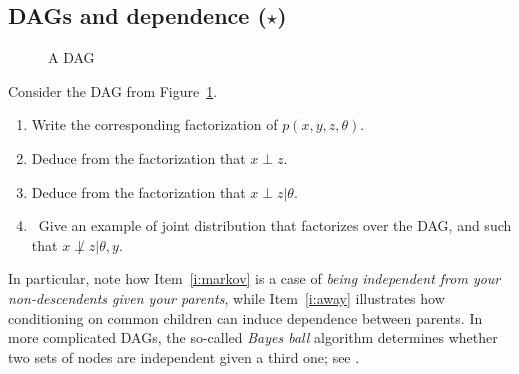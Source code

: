 \documentclass{article}
\begin{document}
\subsection{DAGs and dependence ($\star$)}
\begin{figure}
  \centering
\caption{A DAG}
\label{f:dag}
\end{figure}

Consider the DAG from Figure~\ref{f:dag}.
\begin{enumerate}
\item Write the corresponding factorization of $p(x,y,z,\theta)$.
\item Deduce from the factorization that $x\perp z$.
\item\label{i:markov} Deduce from the factorization that $x\perp z\vert\theta$.
\item\label{i:away} Give an example of joint distribution that factorizes over the DAG, and such that $x\not\perp z\vert \theta, y$.
\end{enumerate}
In particular, note how Item~\ref{i:markov} is a case of \emph{being independent from your non-descendents given your parents}, while Item~\ref{i:away} illustrates how conditioning on common children can induce dependence between parents. In more complicated DAGs, the so-called \emph{Bayes ball} algorithm determines whether two sets of nodes are independent given a third one; see \cite[Section 10.5]{Mur12}.
\end{document}
